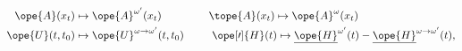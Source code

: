 \begin{equation}	\label{12.93}
	\begin{split}
\ope{A}(x_t) & \mapsto \ope{A}^{\omega'}(x_t)
\qquad\qquad\text{\hphantom{$_i$}}
\tope{A}(x_t)\mapsto \ope{A}^{\omega}(x_t)
\\
\ope{U}(t,t_0) & \mapsto \ope{U}^{\omega\to\omega'}(t,t_0)
\qquad\text{\hphantom{$x$}}
\ope[\prime]{H}(t)\mapsto
	  \underline{\ope{H}}^{\omega'}(t)
	- \underline{\ope{H}}^{\omega\to\omega'}(t) ,
	\end{split}
	\end{equation}

